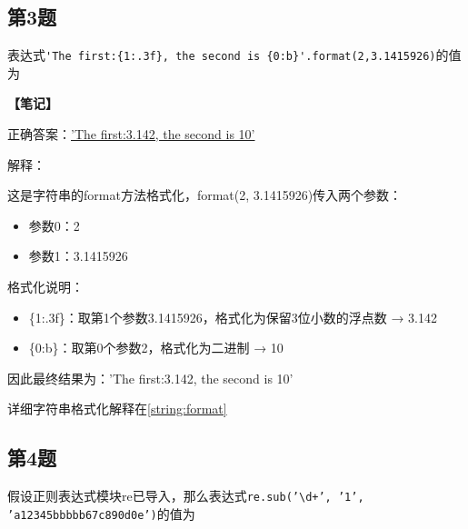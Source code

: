 \subsection{第3题}
表达式\verb|'The first:{1:.3f}, the second is {0:b}'.format(2,3.1415926)|的值为\\
\underline{\hspace{8cm}}

\begin{mdframed}[linewidth=1pt, linecolor=black]

  \textbf{\color{red}【笔记】}

  正确答案：\underline{'The first:3.142, the second is 10'}

  解释：

  \qquad 这是字符串的format方法格式化，format(2, 3.1415926)传入两个参数：
  \begin{itemize}
    \item 参数0：2
    \item 参数1：3.1415926
  \end{itemize}

  \qquad 格式化说明：
  \begin{itemize}
    \item \{1:.3f\}：取第1个参数3.1415926，格式化为保留3位小数的浮点数 → 3.142
    \item \{0:b\}：取第0个参数2，格式化为二进制 → 10
  \end{itemize}

  \qquad 因此最终结果为：'The first:3.142, the second is 10'

  详细字符串格式化解释在\ref{string:format}
\end{mdframed}

\subsection{第4题}
假设正则表达式模块re已导入，那么表达式\texttt{re.sub('\textbackslash d+', '1', 'a12345bbbbb67c890d0e')}的值为\\
\underline{\hspace{8cm}}

